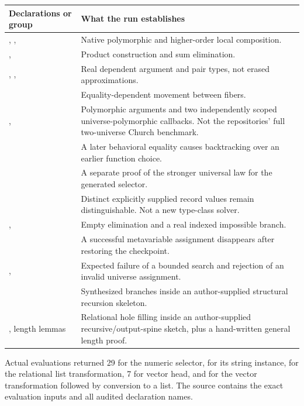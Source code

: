 \begin{longtable}{@{}L{0.31\textwidth}L{0.63\textwidth}@{}}
\toprule
Declarations or group & What the run establishes \\
\midrule\endhead
{}, ,  & Native polymorphic and higher-order local composition. \\
,  & Product construction and sum elimination. \\
, ,  & Real dependent argument and pair types, not erased approximations. \\
 & Equality-dependent movement between fibers. \\
,  & Polymorphic arguments and two independently scoped universe-polymorphic callbacks. Not the repositories' full two-universe Church benchmark. \\
 & A later behavioral equality causes backtracking over an earlier function choice. \\
 & A separate proof of the stronger universal law for the generated selector. \\
 & Distinct explicitly supplied record values remain distinguishable. Not a new type-class solver. \\
,  & Empty elimination and a real indexed impossible branch. \\
 & A successful metavariable assignment disappears after restoring the checkpoint. \\
,  & Expected failure of a bounded search and rejection of an invalid universe assignment. \\
 & Synthesized branches inside an author-supplied structural recursion skeleton. \\
, length lemmas & Relational hole filling inside an author-supplied recursive/output-spine sketch, plus a hand-written general length proof. \\
\bottomrule
\end{longtable}

Actual evaluations returned 29 for the numeric selector,  for its string instance, \code{[11, 12, 13]} for the relational list transformation, 7 for vector head, and \code{[11, 12]} for the vector transformation followed by conversion to a list. The source contains the exact evaluation inputs and all audited declaration names.

